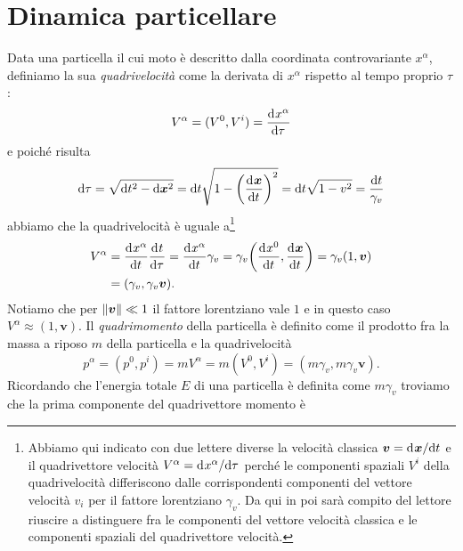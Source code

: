 \section{Dinamica particellare}
\label{sec:dinamica-particellare}

Data una particella il cui moto è descritto dalla coordinata controvariante
$x^{\alpha}$, definiamo la sua \emph{quadrivelocità} come
la derivata di $x^{\alpha}$ rispetto al tempo proprio $\tau$:
\begin{equation}
  V^{\alpha} = (V^{0}, V^{i}) =\frac{{\mathop{}\!\mathrm{d}^{}}x^{\alpha}}{\mathop{}\!\mathrm{d} {\tau}^{}}
\end{equation}
e poiché risulta
\begin{equation}
  \dd \tau = \sqrt{\dd t^{2} - \dd \bm{x}^{2}} = \dd t \sqrt{1 -
    \bigg(\toder{\bm{x}}{t}\bigg)^{2}} = \dd t\sqrt{1 - v^{2}} = \frac{\dd
    t}{\gamma_{v}}
\end{equation}
abbiamo che la quadrivelocità è uguale
a\footnote{Abbiamo qui indicato con due lettere diverse la velocità classica
  $\bm{v} = \mathrm{d}^{}\bm{x} / \mathrm{d} {t}^{}$ e il quadrivettore velocità
  $V^{\alpha} = \mathrm{d}^{}x^{\alpha} / \mathrm{d} {\tau}^{}$ perché le componenti spaziali $V^{i}$
  della quadrivelocità differiscono dalle corrispondenti componenti del vettore
  velocità $v_{i}$ per il fattore lorentziano $\gamma_{v}$.  Da qui in poi sarà
  compito del lettore riuscire a distinguere fra le componenti del vettore
  velocità classica e le componenti spaziali del quadrivettore velocità.}
\begin{equation}
  \begin{split}
    V^{\alpha} &= \toder{x^{\alpha}}{t}\toder{t}{\tau} = \toder{x^{\alpha}}{t}
    \gamma_{v} = \gamma_{v} \bigg(\toder{x^{0}}{t}, \toder{\bm{x}}{t}\bigg) =
    \gamma_{v}(1,\bm{v}) \\
    &= (\gamma_{v}, \gamma_{v}\bm{v}).
  \end{split}
\end{equation}
Notiamo che per $\lVert\bm{v}\rVert \ll 1$ il fattore lorentziano vale $1$ e in
questo caso $V^{\alpha} \approx (1, \bm{v})$.  Il
\emph{quadrimomento} della particella è definito come il
prodotto fra la massa a riposo $m$ della particella e la quadrivelocità
\begin{equation}
  p^{\alpha} = (p^{0},p^{i}) = m V^{\alpha} = m (V^{0}, V^{i}) = (m\gamma_{v},
  m\gamma_{v}\bm{v}).
\end{equation}
Ricordando che l'energia totale $E$ di una particella è definita come
$m\gamma_{v}$ troviamo che la prima componente del quadrivettore momento è
